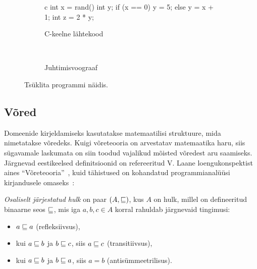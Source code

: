 \documentclass[../thesis.tex]{subfiles}
\begin{document}
\begin{figure}
	\centering
	\begin{subfigure}[b]{0.4\textwidth}
		\centering
		\begin{bminted}{c}
			int x = rand() %
			int y;
			if (x == 0)
				y = 5;
			else
				y = x + 1;
			int z = 2 * y;
		\end{bminted}
		\caption{C-keelne lähtekood}
	\end{subfigure}
	~
	\begin{subfigure}[b]{0.4\textwidth}
		\centering
		\caption{Juhtimisvoograaf}
	\end{subfigure}

	\caption{Tsüklita programmi näidis.}
	\label{fig:prog-if}
\end{figure}


\subsection{Võred}
Domeenide kirjeldamiseks kasutatakse matemaatilisi struktuure, mida nimetatakse võredeks. Kuigi võreteooria on arvestatav matemaatika haru, siis sügavamale laskumata on siin toodud vajalikud mõisted võredest aru saamiseks.
Järgnevad eestikeelsed definitsioonid on refereeritud V. Laane loengukonspektist aines \enquote{Võreteooria}~\cite{laan_voreteooria}, kuid tähistused on kohandatud programmianalüüsi kirjandusele omaseks~\cite[17]{seidl_foundations}:

\begin{definition}
\label{def:järjestatud_hulk}
\emph{Osaliselt järjestatud hulk} on paar $(A, \sqsubseteq)$, kus $A$ on hulk, millel on defineeritud binaarne seos $\sqsubseteq$, mis iga $a, b, c \in A$ korral rahuldab järgnevaid tingimusi:
\begin{itemize}[nosep]
	\item $a \sqsubseteq a$ (refleksiivsus),
	\item kui $a \sqsubseteq b$ ja $b \sqsubseteq c$, siis $a \sqsubseteq c$ (transitiivsus),
	\item kui $a \sqsubseteq b$ ja $b \sqsubseteq a$, siis $a = b$ (antisümmeetrilisus).
\end{itemize}
\end{definition}
\end{document}
